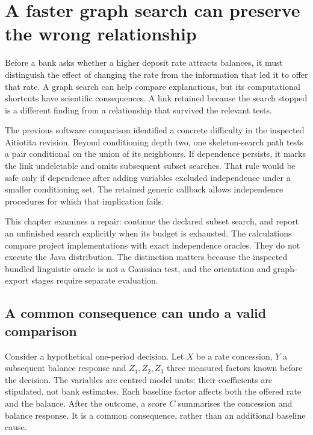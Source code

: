 \chapter{A faster graph search can preserve the wrong relationship}
\label{repair29:discovery}

Before a bank asks whether a higher deposit rate attracts balances, it must
distinguish the effect of changing the rate from the information that led it
to offer that rate. A graph search can help compare explanations, but its
computational shortcuts have scientific consequences. A link retained because
the search stopped is a different finding from a relationship that survived
the relevant tests.

The previous software comparison identified a concrete difficulty in the
inspected Aitiotita revision. Beyond conditioning depth two, one skeleton-search
path tests a pair conditional on the union of its neighbours. If dependence
persists, it marks the link undeletable and omits subsequent subset searches.
That rule would be safe only if dependence after adding variables excluded
independence under a smaller conditioning set. The retained generic callback
allows independence procedures for which that implication fails.
\citep{repair29pc}

This chapter examines a repair: continue the declared subset search, and
report an unfinished search explicitly when its budget is exhausted. The
calculations compare project implementations with exact independence oracles.
They do not execute the Java distribution. The distinction matters because
the inspected bundled linguistic oracle is not a Gaussian test, and the
orientation and graph-export stages require separate evaluation.

\section{A common consequence can undo a valid comparison}

Consider a hypothetical one-period decision. Let $X$ be a rate concession,
$Y$ a subsequent balance response and $Z_1,Z_2,Z_3$ three measured factors
known before the decision. The variables are centred model units; their
coefficients are stipulated, not bank estimates. Each baseline factor affects
both the offered rate and the balance. After the outcome, a score $C$ summarises
the concession and balance response. It is a common consequence, rather than
an additional baseline cause.

